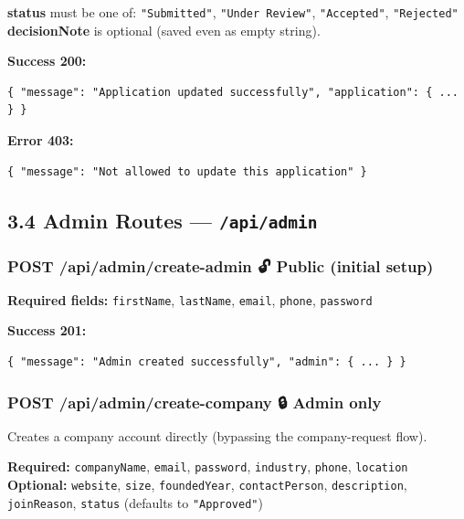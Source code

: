 \documentclass[12pt,a4paper]{article}
\begin{document}
\textbf{status} must be one of: \texttt{"Submitted"}, \texttt{"Under Review"}, \texttt{"Accepted"}, \texttt{"Rejected"}\\
\textbf{decisionNote} is optional (saved even as empty string).

\textbf{Success 200:}
\begin{lstlisting}[language={}]
{ "message": "Application updated successfully", "application": { ... } }
\end{lstlisting}

\textbf{Error 403:}
\begin{lstlisting}[language={}]
{ "message": "Not allowed to update this application" }
\end{lstlisting}

\vspace{0.5cm}

\subsection*{3.4 Admin Routes — \texttt{/api/admin}}

\subsubsection*{POST /api/admin/create-admin \quad 🔓 Public (initial setup)}

\textbf{Required fields:} \texttt{firstName}, \texttt{lastName}, \texttt{email}, \texttt{phone}, \texttt{password}

\textbf{Success 201:}
\begin{lstlisting}[language={}]
{ "message": "Admin created successfully", "admin": { ... } }
\end{lstlisting}

\vspace{0.5cm}

\subsubsection*{POST /api/admin/create-company \quad 🔒 Admin only}

Creates a company account directly (bypassing the company-request flow).

\textbf{Required:} \texttt{companyName}, \texttt{email}, \texttt{password}, \texttt{industry}, \texttt{phone}, \texttt{location}\\
\textbf{Optional:} \texttt{website}, \texttt{size}, \texttt{foundedYear}, \texttt{contactPerson}, \texttt{description}, \texttt{joinReason}, \texttt{status} (defaults to \texttt{"Approved"})
\end{document}
